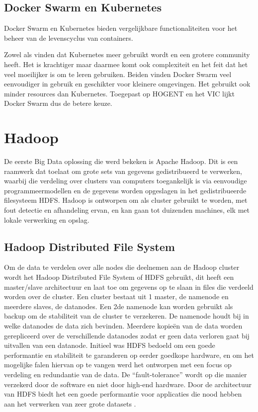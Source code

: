 \subsection{Docker Swarm en Kubernetes}
Docker Swarm en Kubernetes bieden vergelijkbare functionaliteiten voor het beheer van de levenscyclus van containers.

Zowel \textcite{Rosen2022} als \textcite{Chukwudi2023} vinden dat Kubernetes meer gebruikt wordt en een grotere community heeft. Het is krachtiger maar daarmee komt ook complexiteit en het feit dat het veel moeilijker is om te leren gebruiken.
Beiden vinden Docker Swarm veel eenvoudiger in gebruik en geschikter voor kleinere omgevingen. Het gebruikt ook minder resources dan Kubernetes.
\newline
Toegepast op HOGENT en het VIC lijkt Docker Swarm dus de betere keuze.


\section{Hadoop}
De eerste Big Data oplossing die werd bekeken is Apache Hadoop. Dit is een raamwerk dat toelaat om grote sets van gegevens gedistribueerd te verwerken, waarbij die verdeling over clusters van computers toegankelijk is via eenvoudige programmeermodellen en de gegevens worden opgeslagen in het gedistribueerde filesysteem HDFS.
\newline
Hadoop is ontworpen om als cluster gebruikt te worden, met fout detectie en afhandeling ervan, en kan gaan tot duizenden machines, elk met lokale verwerking en opslag. \autocite{ASF2022}

\subsection{Hadoop Distributed File System}
Om de data te verdelen over alle nodes die deelnemen aan de Hadoop cluster wordt het Hadoop Distributed File System of HDFS gebruikt, dit heeft een \newline master/slave architectuur en laat toe om gegevens op te slaan in files die verdeeld worden over de cluster. Een cluster bestaat uit 1 master, de namenode en meerdere slaves, de datanodes. Een 2de namenode kan worden gebruikt als backup om de stabiliteit van de cluster te verzekeren.
\newline
De namenode houdt bij in welke datanodes de data zich bevinden. Meerdere kopieën van de data worden gerepliceerd over de verschillende datanodes zodat er geen data verloren gaat bij uitvallen van een datanode.
\newline
\newline
Initieel was HDFS bedoeld om een goede performantie en stabiliteit te garanderen op eerder goedkope hardware, en om het mogelijke falen hiervan op te vangen werd het ontworpen met een focus op verdeling en redundantie van de data. De ``fault-tolerance'' wordt op die manier verzekerd door de software en niet door high-end hardware.
Door de architectuur van HDFS biedt het een goede performantie voor applicaties die nood hebben aan het verwerken van zeer grote datasets \autocite{Borthakur2007}.
\newline
\newline
